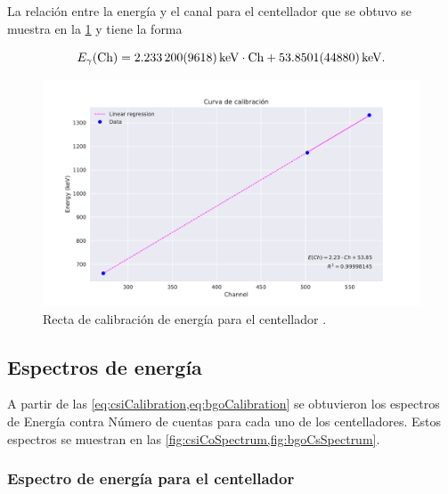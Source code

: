 \documentclass[12pt]{article}
\begin{document}
        La relación entre la energía y el canal para el centellador  que se obtuvo se muestra en la \cref{fig:bgoCalibration} y tiene la forma

        \begin{equation}
            E_{\gamma}(\text{Ch}) = \qty{2.2332 \pm 0.009618}{\keV} \cdot \text{Ch} + \qty{53.8501 \pm 4.4880}{\keV}.
            \label{eq:bgoCalibration}
        \end{equation}

        \begin{figure}[!htb]
            \centering
            \includegraphics[scale = 0.7]{bgo_calibration.pdf}
            \caption{Recta de calibración de energía para el centellador .}
            \label{fig:bgoCalibration}
        \end{figure}

    \subsection*{Espectros de energía}

    A partir de las \cref{eq:csiCalibration,eq:bgoCalibration} se obtuvieron los espectros de Energía contra Número de cuentas para cada uno de los centelladores. Estos espectros se muestran en las \cref{fig:csiCoSpectrum,fig:bgoCsSpectrum}.

    \subsubsection*{Espectro de energía para el centellador }
\end{document}
